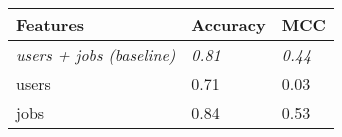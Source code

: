 \begin{tabular}{lll}
\toprule
\textbf{Features}      & \textbf{Accuracy} & \textbf{MCC}  \\
\midrule
\textit{users + jobs (baseline)}& \textit{0.81}   & \textit{0.44}    \\
users   & 0.71  & 0.03 \\
jobs    & 0.84  & 0.53 \\ 
\bottomrule
\end{tabular}

